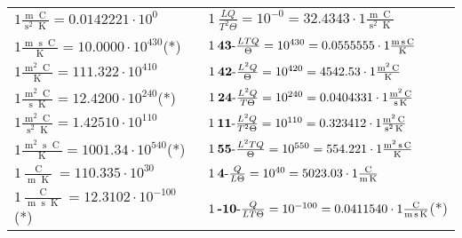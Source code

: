 \begin{center}
\begin{longtable}{l l}
{\color{black}$1 \bm{\mathrm{ }}\frac{\operatorname{m}\operatorname{C}}{\operatorname{s}^2\operatorname{K}} = 0.0142221\cdot10^{0} $}&
	{\color{black}$1\:\text{} \frac{LQ}{T^2\Theta}=10^{-0} = 32.4343 \cdot 1 \bm{\mathrm{ }}\frac{\operatorname{m}\operatorname{C}}{\operatorname{s}^2\operatorname{K}}$}\\
{\color{black}$1 \bm{\mathrm{ }}\frac{\operatorname{m}\operatorname{s}\operatorname{C}}{\operatorname{K}} = 10.0000\cdot10^{430} $}\quad(*)&
	{\color{black}$1\:\text{\textbf{43}-} \frac{LTQ}{\Theta}=10^{430} = 0.0555555 \cdot 1 \bm{\mathrm{ }}\frac{\operatorname{m}\operatorname{s}\operatorname{C}}{\operatorname{K}}$}\\
{\color{black}$1 \bm{\mathrm{ }}\frac{\operatorname{m}^2\operatorname{C}}{\operatorname{K}} = 111.322\cdot10^{410} $}&
	{\color{black}$1\:\text{\textbf{42}-} \frac{L^2Q}{\Theta}=10^{420} = 4542.53 \cdot 1 \bm{\mathrm{ }}\frac{\operatorname{m}^2\operatorname{C}}{\operatorname{K}}$}\\
{\color{black}$1 \bm{\mathrm{ }}\frac{\operatorname{m}^2\operatorname{C}}{\operatorname{s}\operatorname{K}} = 12.4200\cdot10^{240} $}\quad(*)&
	{\color{black}$1\:\text{\textbf{24}-} \frac{L^2Q}{T\Theta}=10^{240} = 0.0404331 \cdot 1 \bm{\mathrm{ }}\frac{\operatorname{m}^2\operatorname{C}}{\operatorname{s}\operatorname{K}}$}\\
{\color{black}$1 \bm{\mathrm{ }}\frac{\operatorname{m}^2\operatorname{C}}{\operatorname{s}^2\operatorname{K}} = 1.42510\cdot10^{110} $}&
	{\color{black}$1\:\text{\textbf{11}-} \frac{L^2Q}{T^2\Theta}=10^{110} = 0.323412 \cdot 1 \bm{\mathrm{ }}\frac{\operatorname{m}^2\operatorname{C}}{\operatorname{s}^2\operatorname{K}}$}\\
{\color{black}$1 \bm{\mathrm{ }}\frac{\operatorname{m}^2\operatorname{s}\operatorname{C}}{\operatorname{K}} = 1001.34\cdot10^{540} $}\quad(*)&
	{\color{black}$1\:\text{\textbf{55}-} \frac{L^2TQ}{\Theta}=10^{550} = 554.221 \cdot 1 \bm{\mathrm{ }}\frac{\operatorname{m}^2\operatorname{s}\operatorname{C}}{\operatorname{K}}$}\\
{\color{black}$1 \bm{\mathrm{ }}\frac{\operatorname{C}}{\operatorname{m}\operatorname{K}} = 110.335\cdot10^{30} $}&
	{\color{black}$1\:\text{\textbf{4}-} \frac{Q}{L\Theta}=10^{40} = 5023.03 \cdot 1 \bm{\mathrm{ }}\frac{\operatorname{C}}{\operatorname{m}\operatorname{K}}$}\\
{\color{black}$1 \bm{\mathrm{ }}\frac{\operatorname{C}}{\operatorname{m}\operatorname{s}\operatorname{K}} = 12.3102\cdot10^{-100} $}\quad(*)&
	{\color{black}$1\:\text{\textbf{-10}-} \frac{Q}{LT\Theta}=10^{-100} = 0.0411540 \cdot 1 \bm{\mathrm{ }}\frac{\operatorname{C}}{\operatorname{m}\operatorname{s}\operatorname{K}}$}\quad(*)\\

\end{longtable}
\end{center}
